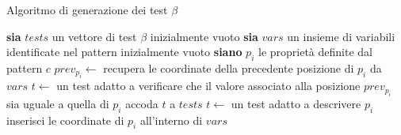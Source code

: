 
\begin{algorithm}
\caption{Algoritmo di generazione dei test $\beta$}\label{alg:analyzer-test-beta}
\begin{algorithmic}
\State \textbf{sia} $tests$ un vettore di test $\beta$ inizialmente vuoto
\State \textbf{sia} $vars$ un insieme di variabili identificate nel pattern inizialmente vuoto
\State \textbf{siano} $p_i$ le proprietà definite dal pattern $c$
			\State $prev_{p_i}\gets$ recupera le coordinate della precedente posizione di $p_i$ da $vars$
			\State $t \gets$ un test adatto a verificare che il valore associato alla posizione $prev_{p_i}$ sia uguale a quella di $p_i$
			\State accoda $t$ a $tests$
		\Else
			\State $t \gets$ un test adatto a descrivere $p_i$
			\State inserisci le coordinate di $p_i$ all'interno di $vars$
		\EndIf
	\EndIf
\EndFor
\State {}
\EndFunction
\end{algorithmic}
\end{algorithm}
